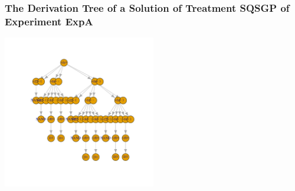  \begin{frame}
 \frametitle{ The Derivation Tree of a Solution of Treatment SQSGP of Experiment ExpA }
 \begin{center}
\includegraphics[width=0.5\textwidth, angle=0]
{ExpADerivationTreeFigure001.pdf}
 \end{center}
 \label{report/ExpADerivationTreeFigure001.pdf}  
 \end{frame}

